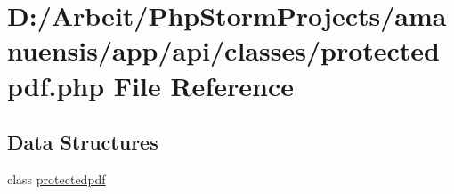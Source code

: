 \hypertarget{protectedpdf_8php}{}\section{D\+:/\+Arbeit/\+Php\+Storm\+Projects/amanuensis/app/api/classes/protectedpdf.php File Reference}
\label{protectedpdf_8php}
\subsection*{Data Structures}
\begin{DoxyCompactItemize}
\item 
class \hyperlink{classprotectedpdf}{protectedpdf}
\end{DoxyCompactItemize}
